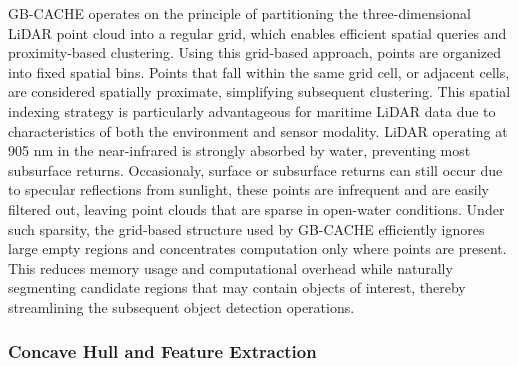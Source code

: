 \documentclass{erauthesis}
\begin{document}
GB-CACHE operates on the principle of partitioning the three-dimensional LiDAR point cloud into a regular grid, which enables efficient spatial queries and proximity-based clustering. Using this grid-based approach, points are organized into fixed spatial bins.
Points that fall within the same grid cell, or adjacent cells, are considered spatially proximate, simplifying subsequent clustering.
This spatial indexing strategy is particularly advantageous for maritime LiDAR data due to characteristics of both the environment and sensor modality. LiDAR operating at 905 nm in the near-infrared is strongly absorbed by water, preventing most subsurface returns. Occasionaly, surface or subsurface returns can still occur due to specular reflections from sunlight, these points are infrequent and are easily filtered out, leaving point clouds that are sparse in open-water conditions. 
Under such sparsity, the grid-based structure used by GB-CACHE efficiently ignores large empty regions and concentrates computation only where points are present. 
This reduces memory usage and computational overhead while naturally segmenting candidate regions that may contain objects of interest, thereby streamlining the subsequent object detection operations.


\subsubsection{Concave Hull and Feature Extraction} \label{gbcache_features}
\end{document}
